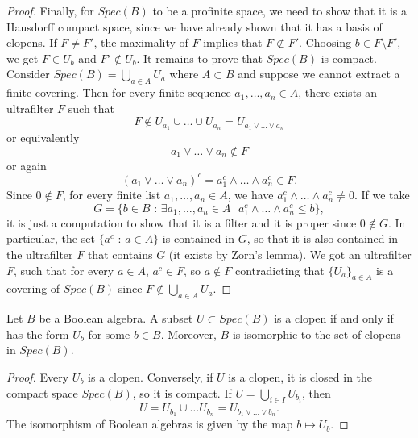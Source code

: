 \begin{lemma}
\begin{proof}
        Finally, for $Spec(B)$ to be a profinite space, we need to show that it is a Hausdorff compact space, since we have already shown that it has a basis of clopens. If $F\not= F'$, the maximality of $F$ implies that $F\not\subset F'$. Choosing $b\in F\setminus F'$, we get $F\in U_b$ and $F'\not\in U_b$. It remains to prove that $Spec(B)$ is compact. Consider $Spec(B) = \bigcup_{a\in A}U_a$ where $A\subset B$ and suppose we cannot extract a finite covering. Then for every finite sequence $a_1,\dots, a_n\in A$, there exists an ultrafilter $F$ such that
        \[ F\not\in U_{a_1}\cup\dots\cup U_{a_n} = U_{a_1\vee\dots\vee a_n} \]
        or equivalently
        \[ a_1\vee\dots\vee a_n\not\in F \]
        or again
        \[ (a_1\vee\dots\vee a_n )^c = a_1^c\wedge\dots\wedge a_n^c \in F.  \]
        Since $0\not\in F$, for every finite list $a_1,\dots, a_n\in A$, we have $a_1^c\wedge\dots\wedge a_n^c\not= 0$. If we take
        \[ G = \{ b\in B \text{ : } \exists a_1,\dots, a_n\in A\text{  } a_1^c\wedge\dots\wedge a_n^c\leq b \}, \]
        it is just a computation to show that it is a filter and it is proper since $0\not\in G$. In particular, the set $\{a^c\text{ : }a \in A\}$ is contained in $G$, so that it is also contained in the ultrafilter $F$ that contains $G$ (it exists by Zorn's lemma). We got an ultrafilter $F$, such that for every $a\in A$, $a^c\in F$, so $a\not\in F$ contradicting that $\{U_a\}_{a\in A}$ is a covering of $Spec(B)$ since $F\not\in \bigcup_{a\in A}U_a$.
    \end{proof}
\end{lemma}

\begin{lemma}
    Let $B$ be a Boolean algebra. A subset $U\subset Spec(B)$ is a clopen if and only if has the form $U_b$ for some $b\in B$. Moreover, $B$ is isomorphic to the set of clopens in $Spec(B)$.
    \begin{proof}
        Every $U_b$ is a clopen. Conversely, if $U$ is a clopen, it is closed in the compact space $Spec(B)$, so it is compact. If $U = \bigcup_{i\in I}U_{b_i}$, then 
        \[ U = U_{b_1}\cup\dots U_{b_n} = U_{b_1\vee\dots\vee b_n}. \]
        The isomorphism of Boolean algebras is given by the map $b\longmapsto U_b$.
    \end{proof}
\end{lemma}

